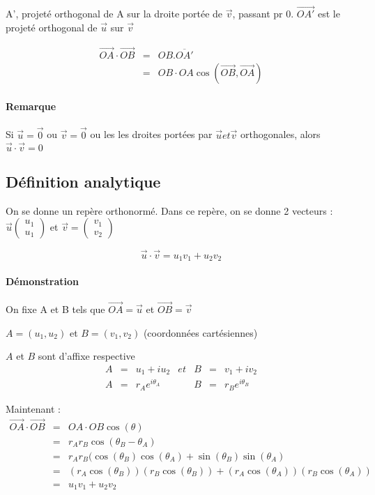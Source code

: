 	A', projeté orthogonal de A sur la droite portée de $\vec{v}$, passant pr 0. $\vec{OA'}$ est le projeté orthogonal de $\vec{u}$ sur $\vec{v}$

	\[\begin{array}{rcl}
				\vec{OA} \cdot \vec{OB} &=& OB.\overline{OA'} \\
	&=& OB \cdot OA \cos(\vec{OB}, \vec{OA})\end{array}\]

\paragraph{Remarque}
Si $\vec{u} = \vec{0}$ ou $\vec{v} = \vec{0}$ ou les les droites portées par $\vec{u} et \vec{v}$ orthogonales, alors $\vec{u}\cdot\vec{v} = 0$

\subsection{Définition analytique}
	On se donne un repère orthonormé. Dans ce repère, on se donne 2 vecteurs : $\vec{u} \begin{pmatrix}
		u_1 \\
		u_1
	\end{pmatrix}$ et $\vec{v} = \begin{pmatrix}
		v_1 \\
	v_2\end{pmatrix}$

	\[\vec{u}\cdot\vec{v} = u_1v_1 + u_2v_2\]

	\paragraph{Démonstration} On fixe A et B tels que $\vec{OA} = \vec{u}$ et $\vec{OB} = \vec{v}$

	$A = (u_1, u_2) $ et $B = (v_1, v_2)$ (coordonnées cartésiennes)

	$A$ et $B$ sont d'affixe respective 
	\[\begin{array}{rcccccl}
			A&=&u_1+iu_2 &et& B&=&v_1 + iv_2 \\
	A&=& r_Ae^{i\theta_A} && B &=& r_B e^{i\theta_B}\end{array}\]

	Maintenant :
	\[\begin{array}{rcl}
		\vec{OA}\cdot\vec{OB} &=& OA \cdot OB \cos (\theta) \\
						  &=& r_Ar_B \cos(\theta_B-\theta_A)\\
						  &=& r_Ar_B (\cos(\theta_B) \cos(\theta_A) + \sin(\theta_B) \sin(\theta_A)  \\
							&=& (r_A \cos(\theta_B)) (r_B \cos(\theta_B)) + (r_A \cos(\theta_A))(r_B\cos(\theta_A)) \\
							&=& u_1v_1 + u_2v_2\end{array}\]

